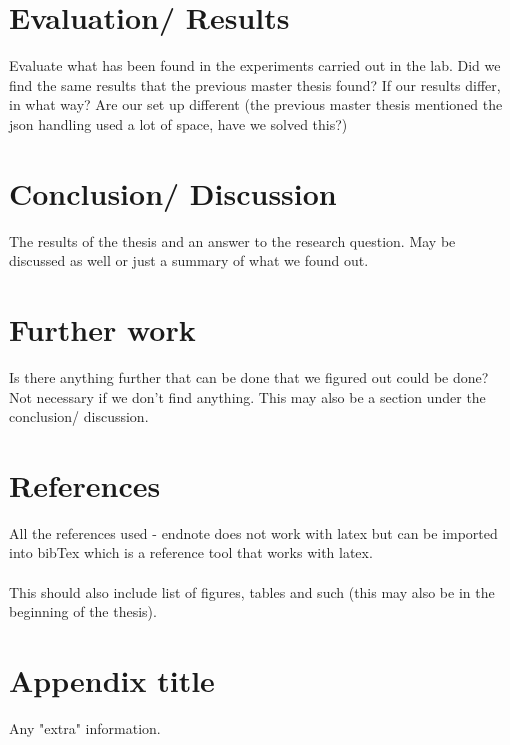 \documentclass[12pt]{report}
\begin{document}
\chapter{Evaluation/ Results}
Evaluate what has been found in the experiments carried out in the lab. Did we find the same results that the previous master thesis found? If our results differ, in what way? Are our set up different (the previous master thesis mentioned the json handling used a lot of space, have we solved this?)


\chapter{Conclusion/ Discussion}
The results of the thesis and an answer to the research question. May be discussed as well or just a summary of what we found out.

\chapter{Further work}
Is there anything further that can be done that we figured out could be done? Not necessary if we don't find anything. This may also be a section under the conclusion/ discussion.

\chapter{References}
All the references used - endnote does not work with latex but can be imported into bibTex which is a reference tool that works with latex.\\
\\
This should also include list of figures, tables and such (this may also be in the beginning of the thesis).

\appendix
\chapter{Appendix title}
Any "extra" information.
\end{document}
